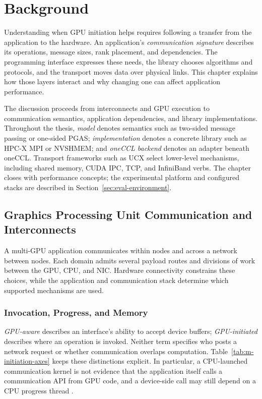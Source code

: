 \chapter{Background}\label{ch:m-problem}

Understanding when GPU initiation helps requires following a transfer from the application to the hardware. An application's \emph{communication signature} describes its operations, message sizes, rank placement, and dependencies. The programming interface expresses these needs, the library chooses algorithms and protocols, and the transport moves data over physical links. This chapter explains how those layers interact and why changing one can affect application performance.

The discussion proceeds from interconnects and GPU execution to communication semantics, application dependencies, and library implementations. Throughout the thesis, \emph{model} denotes semantics such as two-sided message passing or one-sided PGAS; \emph{implementation} denotes a concrete library such as HPC-X MPI or NVSHMEM; and \emph{oneCCL backend} denotes an adapter beneath oneCCL. Transport frameworks such as \ac{UCX} select lower-level mechanisms, including shared memory, CUDA \ac{IPC}, \ac{TCP}, and InfiniBand verbs. The chapter closes with performance concepts; the experimental platform and configured stacks are described in Section~\ref{sec:eval-environment}.

\section{Graphics Processing Unit Communication and Interconnects}\label{sec:interconnects}

A multi-GPU application communicates within nodes and across a network between nodes. Each domain admits several payload routes and divisions of work between the GPU, CPU, and \ac{NIC}. Hardware connectivity constrains these choices, while the application and communication stack determine which supported mechanisms are used.

\subsection{Invocation, Progress, and Memory}\label{sec:initiation-axes}

\emph{GPU-aware} describes an interface's ability to accept device buffers; \emph{GPU-initiated} describes where an operation is invoked. Neither term specifies who posts a network request or whether communication overlaps computation. Table~\ref{tab:m-initiation-axes} keeps these distinctions explicit. In particular, a CPU-launched communication kernel is not evidence that the application itself calls a communication API from GPU code, and a device-side call may still depend on a CPU progress thread \cite{unat_landscape_2026,hamidouche_kernel-initiated_2026}.

